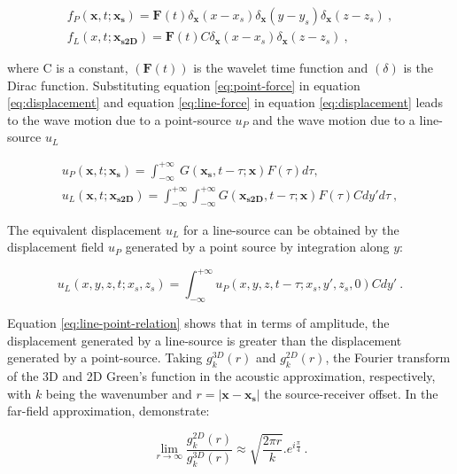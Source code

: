 \documentclass[manuscript,revised]{geophysics}
\begin{document}
\begin{eqnarray} 
f_{P}(\mathbf{x},t;\mathbf{x_{s}})=\mathbf{F}(t)\delta_{\mathbf{x}}(x-x_{s})\delta_{\mathbf{x}}(y-y_{s})\delta_{\mathbf{x}}(z-z_{s})\ , \label{eq:point-force} \\
f_{L}(x,t;\mathbf{x_{s2D}})=\mathbf{F}(t) C \delta_{\mathbf{x}}(x-x_{s})\delta_{\mathbf{x}}(z-z_{s})\ , \label{eq:line-force}
\end{eqnarray}

\noindent where C is a constant, $(\mathbf{F}(t)) $ is the wavelet time function and $(\delta)$ is the Dirac function. Substituting equation \ref{eq:point-force} in equation \ref{eq:displacement} and equation \ref{eq:line-force} in equation \ref{eq:displacement} leads to the wave motion due to a point-source $u_{P}$ and the wave motion due to a line-source $u_{L}$ 

\begin{eqnarray}
u_{P}(\mathbf{x},t;\mathbf{x_{s}})=\int_{-\infty}^{+\infty}\ G(\mathbf{x_{s}},t-\tau;\mathbf{x})F(\tau)d\tau, \label{eq:point-displacement} \\
u_{L}(\mathbf{x},t;\mathbf{x_{s2D}})=\int_{-\infty}^{+\infty} \int_{-\infty}^{+\infty} G(\mathbf{x_{s2D}},t-\tau;\mathbf{x})F(\tau)Cdy'd\tau\ , \label{eq:line-displacement}
\end{eqnarray}

\noindent The equivalent displacement $u_{L}$ for a line-source can be obtained by the displacement field $u_{P}$ generated by a point source by integration along $y$:

\begin{equation}
u_{L}(x,y,z,t;x_{s},z_{s})=\int_{-\infty}^{+\infty}u_{P}(x,y,z,t-\tau;x_{s},y',z_{s},0)Cdy'\ .
\label{eq:line-point-relation}
\end{equation}

\noindent Equation \ref{eq:line-point-relation} shows that in terms of amplitude, the displacement generated by a line-source is greater than the displacement generated by a point-source.
\noindent Taking $g_{k}^{3D}(r)$ and $g_{k}^{2D}(r)$, the Fourier transform of the 3D and 2D Green's function in the acoustic approximation, respectively, with $k$ being the wavenumber and $r=|\mathbf{x}-\mathbf{x_{s}}|$ the source-receiver offset. In the far-field approximation, \citet{Forbriger_LSS_2014} demonstrate:

\begin{equation}
\lim\limits_{r \rightarrow \infty} \frac{g_{k}^{2D}(r)}{g_{k}^{3D}(r)}\approx \sqrt{\frac{2\pi r}{k}}.e^{i\frac{\pi}{4}}\ .
\label{eq:far-field-frac}
\end{equation}
\end{document}
